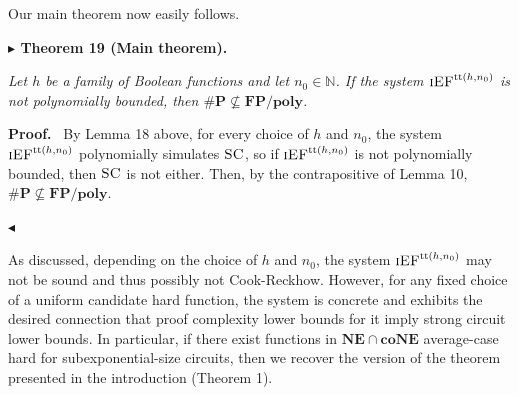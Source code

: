 \documentclass[11pt]{article}
\newcommand{\SC}{\textsc{SC}}
\newcommand{\iEF}{\textsc{iEF}}
\newcommand{\N}{\mathbb{N}}
\newcommand{\iEFtt}[1]{\iEF^{\mathrm{tt}(#1)}}
\newenvironment{statement}[1]%
  {\par\medskip\noindent\textbf{#1}\par\nopagebreak\smallskip\noindent\itshape}%
  {\par\medskip}
\newenvironment{authorproof}%
  {\par\medskip\noindent\textbf{Proof.}\ \ignorespaces}%
  {\unskip\par\nopagebreak\smallskip\noindent\hfill$\blacktriangleleft$\par\medskip}
\begin{document}

Our main theorem now easily follows.

\begin{statement}{$\blacktriangleright$ Theorem 19 (Main theorem).}
Let $h$ be a family of Boolean functions and let $n_{0} \in \N$. If the system $\iEFtt{h,n_{0}}$
is not polynomially bounded, then $\#\mathbf{P} \not\subseteq \mathbf{FP}/\mathbf{poly}$.
\end{statement}

\begin{authorproof}
By Lemma 18 above, for every choice of $h$ and $n_{0}$, the system $\iEFtt{h,n_{0}}$
polynomially simulates $\SC$, so if $\iEFtt{h,n_{0}}$ is not polynomially bounded, then $\SC$ is
not either. Then, by the contrapositive of Lemma 10,
$\#\mathbf{P} \not\subseteq \mathbf{FP}/\mathbf{poly}$.
\end{authorproof}

As discussed, depending on the choice of $h$ and $n_{0}$, the system $\iEFtt{h,n_{0}}$ may not be
sound and thus possibly not Cook-Reckhow. However, for any fixed choice of a uniform candidate
hard function, the system is concrete and exhibits the desired connection that proof complexity
lower bounds for it imply strong circuit lower bounds. In particular, if there exist functions
in $\mathbf{NE} \cap \mathbf{coNE}$ average-case hard for subexponential-size circuits, then we
recover the version of the theorem presented in the introduction (Theorem 1).
\end{document}
